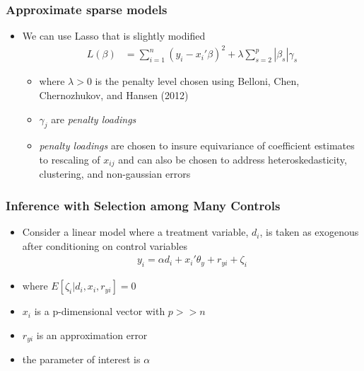 \documentclass[
  shownotes,
  xcolor={svgnames},
  hyperref={colorlinks,citecolor=DarkBlue,linkcolor=DarkRed,urlcolor=DarkBlue}
  , aspectratio=169]{beamer}
\begin{document}
\begin{frame}[fragile]
\frametitle{Approximate sparse models}
\begin{itemize}

\item We can use Lasso that is slightly modified
\begin{align}
L(\beta) &= \sum_{i=1}^n (y_i-x_i'\beta)^2 + \lambda \sum_{s=2}^p |\beta_s| \gamma_s
\end{align}

\begin{itemize}
  \item where $\lambda>0$ is the penalty level chosen using  Belloni, Chen, Chernozhukov, and Hansen (2012)
  \item $\gamma_j$ are {\it penalty loadings}
  \item  {\it penalty loadings} are chosen to insure equivariance of coefficient estimates to rescaling of $x_{ij}$ and can also be chosen to address heteroskedasticity, clustering, and non-gaussian errors

\end{itemize}
\end{itemize}

\end{frame}
\begin{frame}[fragile]
\frametitle{Inference with Selection among Many Controls}

\begin{itemize}
\item Consider a linear model where a treatment variable, $d_i$, is taken as exogenous after conditioning on control variables
\begin{align}
y_i = \alpha d_i + x_i'\theta_y +r_{yi} + \zeta_i
\end{align}

\item where $E[\zeta_i|d_i,x_i,r_{yi}]=0$ 
\item $x_i$ is a p-dimensional vector with $p>>n$
\item $r_{yi}$ is an approximation error
\item the parameter of interest is $\alpha$

\end{itemize}
\end{frame}
\end{document}
